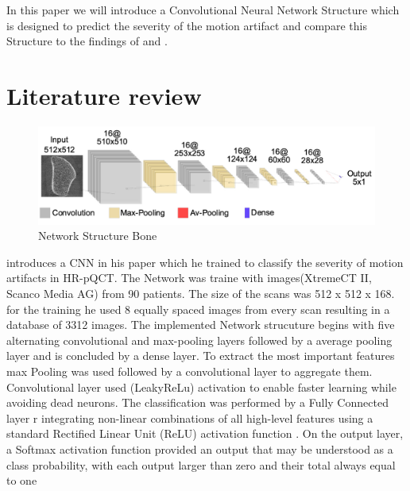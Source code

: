 \documentclass[
a4paper, 
12pt,
grayscalebody, %
abstract=on,
twoside, BCOR10mm, 12pt, DIV13,headinclude, footexclude, final, abstracton, openright
]{ibireprt}
\numberwithin{equation}{chapter}
\numberwithin{table}{chapter}
\numberwithin{figure}{chapter}
\numberwithin{algorithm}{chapter}
\numberwithin{example}{chapter}
\numberwithin{example}{chapter}
\begin{document}
In this paper we will introduce a Convolutional Neural Network Structure which is designed to predict the severity of the motion artifact and compare this Structure to the findings of \cite{Sode2011} and \cite{Walle2023}. 





\chapter{Literature review}

\begin{figure}[h]	
	\center
	\includegraphics[width = 1 \textwidth]{Bone_Network_Structure.png}%
	\caption{Network Structure Bone}
	\label{fig:fig1}
\end{figure}%

\cite{Walle2023} introduces a CNN in his paper which he trained to classify the severity of motion artifacts in HR-pQCT. The Network was traine with images(XtremeCT II, Scanco Media AG) from 90 patients. The size of the scans was 512 x 512 x 168. for the training he used 8 equally spaced images from every scan  resulting in a database of 3312 images.
The implemented Network strucuture begins with five alternating convolutional and max-pooling layers followed by a average pooling layer and is concluded by a dense layer. To extract the most important features max Pooling was used followed by a convolutional layer to aggregate them. Convolutional layer used (LeakyReLu) activation to enable faster learning while avoiding dead neurons.
 The classification was performed by a Fully Connected layer r integrating non-linear combinations of all high-level features using a standard Rectified Linear
Unit (ReLU) activation function . On the output layer, a Softmax activation function provided an output that may be understood as a class probability, with each output larger than zero and their total always equal to one
\end{document}
